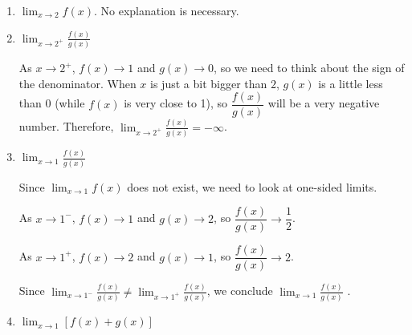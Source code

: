 \documentclass{article}
\theoremstyle{theorem}
\begin{document}
\begin{enumerate}
\begin{enumerate}[resume]
    \begin{enumerate}
    \item
      \begin{problem}[0.25in]
        $\displaystyle\lim_{x \to 2} f(x)$. No explanation is necessary. 
      \end{problem}

      \begin{solution}
      \end{solution}

    \item
      \begin{problem}[\vfill]
        $\displaystyle\lim_{x \to 2^+} \frac{f(x)}{g(x)}$
      \end{problem}

      \begin{solution}
        As $x \to 2^+$, $f(x) \to 1$ and $g(x) \to 0$, so we need to think about the sign of the denominator. When $x$ is just a bit bigger than $2$, $g(x)$ is a little less than 0 (while $f(x)$ is very close to 1), so $\dfrac{f(x)}{g(x)}$ will be a very negative number. Therefore, $\displaystyle\lim_{x \to 2^+} \frac{f(x)}{g(x)} = \boxed{-\infty}$. 
      \end{solution}

    \item
      \begin{problem}[\vfill]
        $\displaystyle \lim_{x \to 1} \frac{f(x)}{g(x)}$
      \end{problem}

      \begin{solution}
        Since $\displaystyle \lim_{x \to 1} f(x)$ does not exist, we need to look at one-sided limits.

        As $x \to 1^-$, $f(x) \to 1$ and $g(x) \to 2$, so $\dfrac{f(x)}{g(x)} \to \dfrac{1}{2}$.

        As $x \to 1^+$, $f(x) \to 2$ and $g(x) \to 1$, so $\dfrac{f(x)}{g(x)} \to 2$.

        Since $\displaystyle \lim_{x \to 1^-} \frac{f(x)}{g(x)} \neq \lim_{x \to 1^+} \frac{f(x)}{g(x)}$, we conclude $\displaystyle \lim_{x \to 1} \frac{f(x)}{g(x)}$ .
      \end{solution}

    \item
      \begin{problem}[\vfill]
        $\displaystyle\lim_{x \to 1} [f(x)+g(x)]$
      \end{problem}


\end{enumerate}
\end{enumerate}
\end{enumerate}
\end{document}
